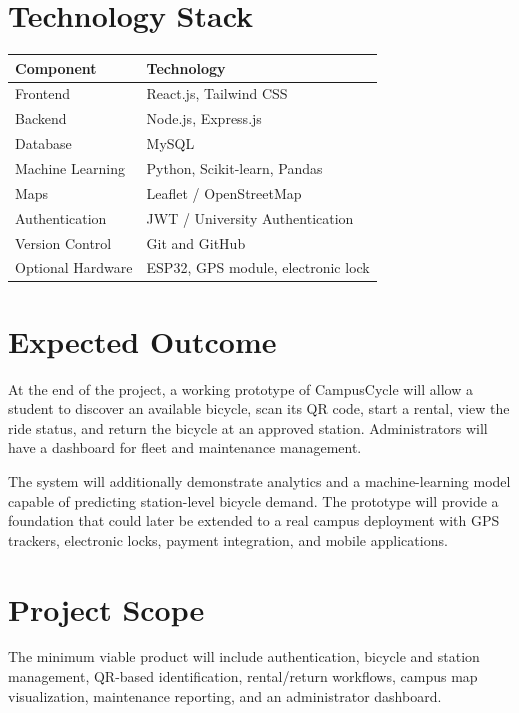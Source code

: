 \documentclass[12pt,a4paper]{article}
\begin{document}
\section{Technology Stack}

\begin{center}
\begin{tabular}{ll}
\textbf{Component} & \textbf{Technology} \\
\hline
Frontend & React.js, Tailwind CSS \\
Backend & Node.js, Express.js \\
Database & MySQL \\
Machine Learning & Python, Scikit-learn, Pandas \\
Maps & Leaflet / OpenStreetMap \\
Authentication & JWT / University Authentication \\
Version Control & Git and GitHub \\
Optional Hardware & ESP32, GPS module, electronic lock \\
\end{tabular}
\end{center}

\section{Expected Outcome}

At the end of the project, a working prototype of CampusCycle will allow a student to discover an available bicycle, scan its QR code, start a rental, view the ride status, and return the bicycle at an approved station. Administrators will have a dashboard for fleet and maintenance management.

The system will additionally demonstrate analytics and a machine-learning model capable of predicting station-level bicycle demand. The prototype will provide a foundation that could later be extended to a real campus deployment with GPS trackers, electronic locks, payment integration, and mobile applications.

\section{Project Scope}

The minimum viable product will include authentication, bicycle and station management, QR-based identification, rental/return workflows, campus map visualization, maintenance reporting, and an administrator dashboard.
\end{document}
